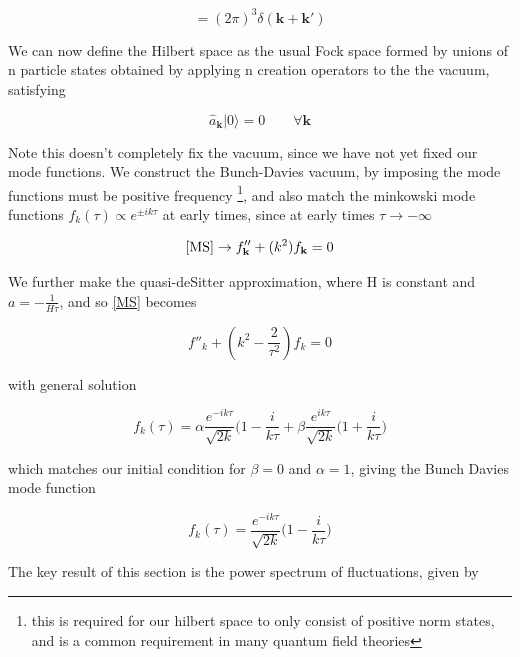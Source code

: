 \documentclass[a4paper,10pt]{article}
\renewcommand{\v}[1]{\mathbf{#1}}
\newcommand{\ann}[1]{\hat{a}_{\v{#1}}}
\newcommand{\cre}[1]{\hat{a}^\dagger_{\v{#1}}}
\newcommand{\vac}{|0\rangle}
\begin{document}
\begin{equation}
[\ann{k}, \cre{k}] = (2\pi)^3\delta(\v{k}+\v{k'})
\end{equation}

We can now define the Hilbert space as the usual Fock space formed by unions of n particle states obtained by applying n creation operators to the the vacuum, satisfying 

\begin{equation}
\ann{k}\vac =0 \qquad \forall \v{k}
\end{equation}

Note this doesn't completely fix the vacuum, since we have not yet fixed our mode functions. We construct the Bunch-Davies vacuum, by imposing the mode functions must be positive frequency \footnote{this is required for our hilbert space to only consist of positive norm states, and is a common requirement in many quantum field theories}, and also match the minkowski mode functions $f_k(\tau) \propto e^{\pm ik\tau}$ at early times, since at early times $\tau \rightarrow -\infty$

\begin{equation}
\ref{MS} \rightarrow  f''_{\v{k}} + (k^2)f_{\v{k}} = 0
\end{equation}

We further make the quasi-deSitter approximation, where H is constant and $a=-\frac{1}{H\tau}$, and so \ref{MS} becomes

\begin{equation}
f''_k + (k^2-\frac{2}{\tau^2})f_k = 0
\end{equation}

with general solution

\begin{equation}
f_k(\tau) = \alpha \frac{e^{-ik\tau}}{\sqrt{2k}}{(1-\frac{i}{k\tau}} + \beta \frac{e^{ik\tau}}{\sqrt{2k}}{(1+\frac{i}{k\tau}})
\end{equation}

which matches our initial condition for $\beta = 0$ and $\alpha=1$, giving the Bunch Davies mode function 

\begin{equation}
f_k(\tau) = \frac{e^{-ik\tau}}{\sqrt{2k}}{(1-\frac{i}{k\tau}})
\end{equation}

The key result of this section is the power spectrum of fluctuations, given by 

%
%
%
\end{document}
